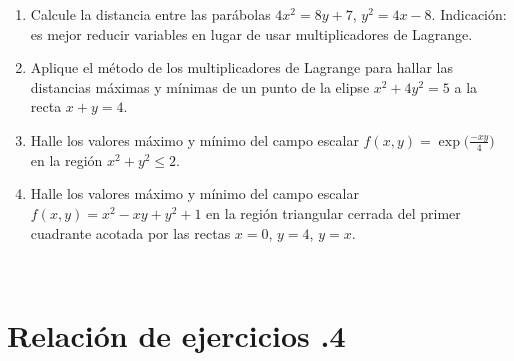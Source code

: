 \begin{enumerate}
\item
Calcule la distancia entre las parábolas $4x^2=8y+7$, $y^2=4x-8$. Indicación: es mejor reducir variables en lugar de usar multiplicadores de Lagrange.


\item
Aplique el método de los multiplicadores de Lagrange para hallar las distancias máximas y mínimas de un punto de la elipse $x^2+4y^2=5$ a la recta $x+y=4$.


\item
Halle los valores máximo y mínimo del campo escalar
$f(x,y)=\exp\big(\frac{-xy}4\big)$ en la región $x^2+y^2\leq 2$.


\item 
Halle los valores máximo y mínimo del campo escalar
$f(x,y)=x^2-xy+y^2+1$ en la región triangular cerrada del primer cuadrante acotada por las rectas $x=0$, $y=4$, $y=x$.





\end{enumerate}


\newpage
\thispagestyle{empty}

\ 

\vfill
\newpage

\section*{Relación de ejercicios \thechapter.4}

